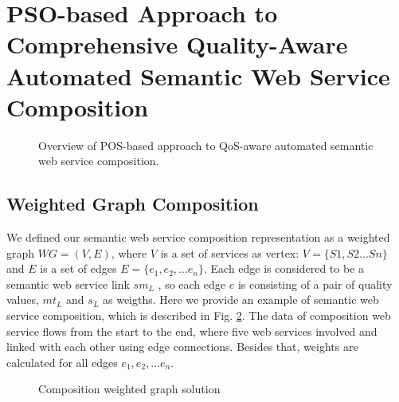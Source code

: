 \documentclass{llncs}
\begin{document}
\section{PSO-based Approach to Comprehensive Quality-Aware Automated Semantic Web Service Composition}\label{qswsc_approach}

\begin{figure}[h]
\centering
{}
 \caption{Overview of POS-based approach to QoS-aware automated semantic web service composition.}
 \label{overview}
\end{figure}

\subsection{Weighted Graph Composition}

We defined our semantic web service composition representation as a weighted graph $WG = (V, E)$, where $V$ is a set of services as vertex: $V=\{S1, S2...Sn \}$ and $E$ is a set of edges $E = \{e_{1}, e_{2},... e_{n} \}$. Each edge is considered to be a semantic web service link $sm_{L}$ , so each edge $e$ is consisting of a pair of quality values, $mt_{L}$ and $s_{L}$ as weigths. Here we provide an example of semantic web service composition, which is described in Fig. \ref{wscs}. The data of composition web service flows from the start to the end, where five web services involved and linked with each other using edge connections. Besides that, weights are calculated for all edges $e_{1}, e_{2},... e_{n}$.

\begin{figure}[h]
\centering
{}
 \caption{Composition weighted graph solution}
 \label{wscs}
\end{figure}
\end{document}
